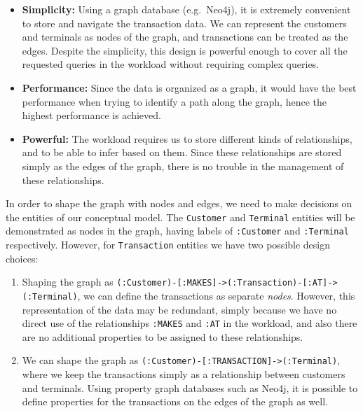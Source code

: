 \begin{itemize}
\tightlist
\item
  \textbf{Simplicity:} Using a graph database (e.g.~Neo4j), it is
  extremely convenient to store and navigate the transaction data. We
  can represent the customers and terminals as nodes of the graph, and
  transactions can be treated as the edges. Despite the simplicity, this
  design is powerful enough to cover all the requested queries in the
  workload without requiring complex queries.
\item
  \textbf{Performance:} Since the data is organized as a graph, it would
  have the best performance when trying to identify a path along the
  graph, hence the highest performance is achieved.
\item
  \textbf{Powerful:} The workload requires us to store different kinds
  of relationships, and to be able to infer based on them. Since these
  relationships are stored simply as the edges of the graph, there is no
  trouble in the management of these relationships.
\end{itemize}

In order to shape the graph with nodes and edges, we need to make
decisions on the entities of our conceptual model. The \texttt{Customer}
and \texttt{Terminal} entities will be demonstrated as nodes in the
graph, having labels of \texttt{:Customer} and \texttt{:Terminal}
respectively. However, for \texttt{Transaction} entities we have two
possible design choices:

\begin{enumerate}
\def\labelenumi{\arabic{enumi}.}
\tightlist
\item
  Shaping the graph as
  \texttt{(:Customer)-{[}:MAKES{]}-\textgreater{}(:Transaction)-{[}:AT{]}-\textgreater{}(:Terminal)},
  we can define the transactions as separate \emph{nodes}. However, this
  representation of the data may be redundant, simply because we have no
  direct use of the relationships \texttt{:MAKES} and \texttt{:AT} in
  the workload, and also there are no additional properties to be
  assigned to these relationships.
\item
  We can shape the graph as
  \texttt{(:Customer)-{[}:TRANSACTION{]}-\textgreater{}(:Terminal)},
  where we keep the transactions simply as a relationship between
  customers and terminals. Using property graph databases such as Neo4j,
  it is possible to define properties for the transactions on the edges
  of the graph as well.
\end{enumerate}

